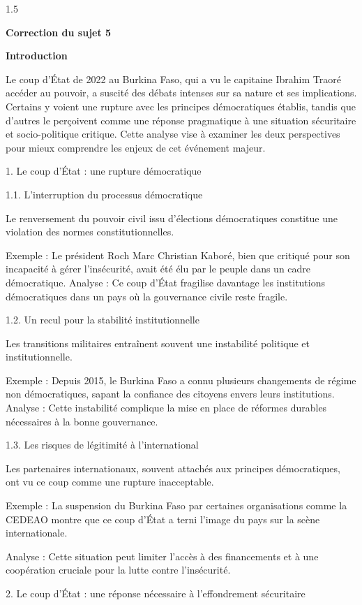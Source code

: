 \documentclass[12pt]{article}
\begin{document}
\begin{spacing}{1.5}
\quad
\quad

\textbf{Correction du sujet 5}

\textbf{Introduction}

Le coup d'État de 2022 au Burkina Faso, qui a vu le capitaine Ibrahim Traoré accéder au pouvoir, a suscité des débats intenses sur sa nature et ses implications. Certains y voient une rupture avec les principes démocratiques établis, tandis que d'autres le perçoivent comme une réponse pragmatique à une situation sécuritaire et socio-politique critique. Cette analyse vise à examiner les deux perspectives pour mieux comprendre les enjeux de cet événement majeur.

1. Le coup d'État : une rupture démocratique

1.1. L'interruption du processus démocratique

Le renversement du pouvoir civil issu d'élections démocratiques constitue une violation des normes constitutionnelles.

Exemple : Le président Roch Marc Christian Kaboré, bien que critiqué pour son incapacité à gérer l'insécurité, avait été élu par le peuple dans un cadre démocratique.
Analyse : Ce coup d'État fragilise davantage les institutions démocratiques dans un pays où la gouvernance civile reste fragile.

1.2. Un recul pour la stabilité institutionnelle

Les transitions militaires entraînent souvent une instabilité politique et institutionnelle.

Exemple : Depuis 2015, le Burkina Faso a connu plusieurs changements de régime non démocratiques, sapant la confiance des citoyens envers leurs institutions.
Analyse : Cette instabilité complique la mise en place de réformes durables nécessaires à la bonne gouvernance.

1.3. Les risques de légitimité à l'international

Les partenaires internationaux, souvent attachés aux principes démocratiques, ont vu ce coup comme une rupture inacceptable.

Exemple : La suspension du Burkina Faso par certaines organisations comme la CEDEAO montre que ce coup d'État a terni l'image du pays sur la scène internationale.

Analyse : Cette situation peut limiter l'accès à des financements et à une coopération cruciale pour la lutte contre l'insécurité.

2. Le coup d'État : une réponse nécessaire à l'effondrement sécuritaire


\end{spacing}
\end{document}
